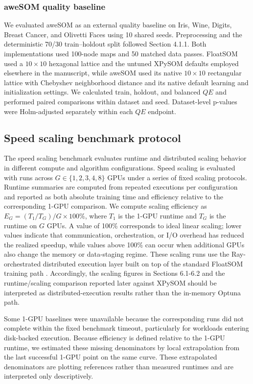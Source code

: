 \documentclass[10pt]{article} %
\begin{document}
\subsubsection{aweSOM quality baseline}

We evaluated aweSOM as an external quality baseline on Iris, Wine, Digits, Breast Cancer, and Olivetti Faces using 10 shared seeds. Preprocessing and the deterministic 70/30 train--holdout split followed Section 4.1.1. Both implementations used 100-node maps and 50 matched data passes. FloatSOM used a $10\times10$ hexagonal lattice and the untuned XPySOM defaults employed elsewhere in the manuscript, while aweSOM used its native $10\times10$ rectangular lattice with Chebyshev neighborhood distance and its native default learning and initialization settings. We calculated train, holdout, and balanced $QE$ and performed paired comparisons within dataset and seed. Dataset-level p-values were Holm-adjusted separately within each $QE$ endpoint.

\subsection{Speed scaling benchmark protocol}

The speed scaling benchmark evaluates runtime and distributed scaling behavior in different compute and algorithm configurations. Speed scaling is evaluated with runs across $G\in\{1,2,3,4,8\}$ GPUs under a series of fixed scaling protocols. Runtime summaries are computed from repeated executions per configuration and reported as both absolute training time and efficiency relative to the corresponding 1-GPU comparison. We compute scaling efficiency as $E_G=(T_1/T_G)/G \times 100\%$, where $T_1$ is the 1-GPU runtime and $T_G$ is the runtime on $G$ GPUs. A value of 100\% corresponds to ideal linear scaling; lower values indicate that communication, orchestration, or I/O overhead has reduced the realized speedup, while values above 100\% can occur when additional GPUs also change the memory or data-staging regime. These scaling runs use the Ray-orchestrated distributed execution layer built on top of the standard FloatSOM training path \citep{moritzRayDistributedFramework2018}. Accordingly, the scaling figures in Sections 6.1-6.2 and the runtime/scaling comparison reported later against XPySOM should be interpreted as distributed-execution results rather than the in-memory Optuna path.

Some 1-GPU baselines were unavailable because the corresponding runs did not complete within the fixed benchmark timeout, particularly for workloads entering disk-backed execution. Because efficiency is defined relative to the 1-GPU runtime, we estimated these missing denominators by local extrapolation from the last successful 1-GPU point on the same curve. These extrapolated denominators are plotting references rather than measured runtimes and are interpreted only descriptively.
\end{document}
